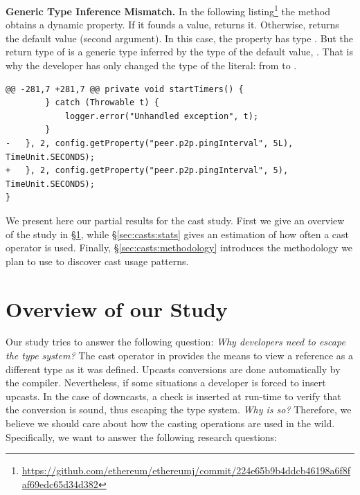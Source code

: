 \textbf{Generic Type Inference Mismatch.}
In the following listing\footnote{\url{https://github.com/ethereum/ethereumj/commit/224e65b9b4ddcb46198a6f8faf69edc65d34d382}}
the  method obtains a dynamic property. If it founds a value, returns it. Otherwise, returns the default value (second argument).
In this case, the property  has type .
But the return type of  is a generic type inferred by the type of the default value, .
That is why the developer has only changed the type of the literal: from  to .

\begin{lstlisting}[style=java]
@@ -281,7 +281,7 @@ private void startTimers() {
        } catch (Throwable t) {
            logger.error("Unhandled exception", t);
        }
-   }, 2, config.getProperty("peer.p2p.pingInterval", 5L), TimeUnit.SECONDS);
+   }, 2, config.getProperty("peer.p2p.pingInterval", 5), TimeUnit.SECONDS);
}
\end{lstlisting}


We present here our partial results for the cast study.
First we give an overview of the study in \S\ref{sec:casts:overview},
while \S\ref{sec:casts:stats} gives an estimation of how often a cast operator is used.
Finally, \S\ref{sec:casts:methodology} introduces the methodology we plan to use to discover cast usage patterns.

\section{Overview of our Study}
\label{sec:casts:overview}

Our study tries to answer the following question: \emph{Why developers need to escape the type system?}
The cast operator in \java{} provides the means to view a reference as a different type as it was defined.
Upcasts conversions are done automatically by the compiler.
Nevertheless, if some situations a developer is forced to insert upcasts.
In the case of downcasts, a check is inserted at run-time to verify that the conversion is sound, thus escaping the type system.
\emph{Why is so?}
Therefore, we believe we should care about how the casting operations are used in the wild.
Specifically, we want to answer the following research questions:


